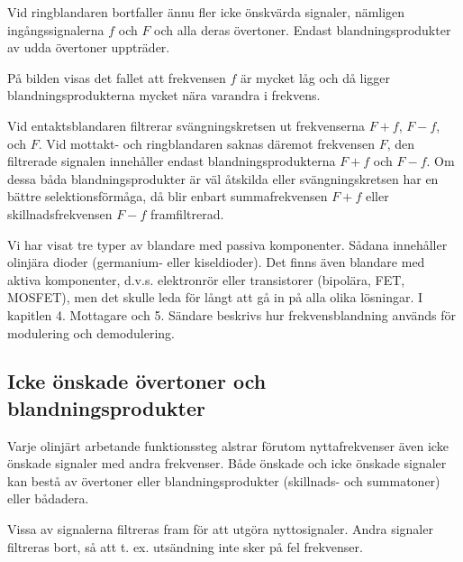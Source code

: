 Vid ringblandaren bortfaller ännu fler icke önskvärda signaler,
nämligen ingångssignalerna \(f\) och \(F\) och alla deras övertoner.
Endast blandningsprodukter av udda övertoner uppträder.

På bilden visas det fallet att frekvensen \(f\) är mycket låg och då
ligger blandningsprodukterna mycket nära varandra i frekvens.

Vid entaktsblandaren filtrerar svängningskretsen ut frekvenserna \(F +
f\), \(F - f\), och \(F\). Vid mottakt- och ringblandaren saknas
däremot frekvensen \(F\), den filtrerade signalen innehåller endast
blandningsprodukterna \(F + f\) och \(F - f\). Om dessa båda
blandningsprodukter är väl åtskilda eller svängningskretsen har en
bättre selektionsförmåga, då blir enbart summafrekvensen \(F + f\)
eller skillnadsfrekvensen \(F - f\) framfiltrerad.

Vi har visat tre typer av blandare med passiva komponenter. Sådana
innehåller olinjära dioder (germanium- eller kiseldioder).  Det finns
även blandare med aktiva komponenter, d.v.s. elektronrör eller
transistorer (bipolära, FET, MOSFET), men det skulle leda för långt
att gå in på alla olika lösningar.  I kapitlen 4. Mottagare och
5. Sändare beskrivs hur frekvensblandning används för modulering och
demodulering.

\subsection{Icke önskade övertoner och blandningsprodukter}

Varje olinjärt arbetande funktionssteg alstrar förutom nyttafrekvenser
även icke önskade signaler med andra frekvenser. Både önskade och icke
önskade signaler kan bestå av övertoner eller blandningsprodukter
(skillnads- och summatoner) eller bådadera.

Vissa av signalerna filtreras fram för att utgöra nyttosignaler. Andra
signaler filtreras bort, så att t. ex. utsändning inte sker på fel
frekvenser.

